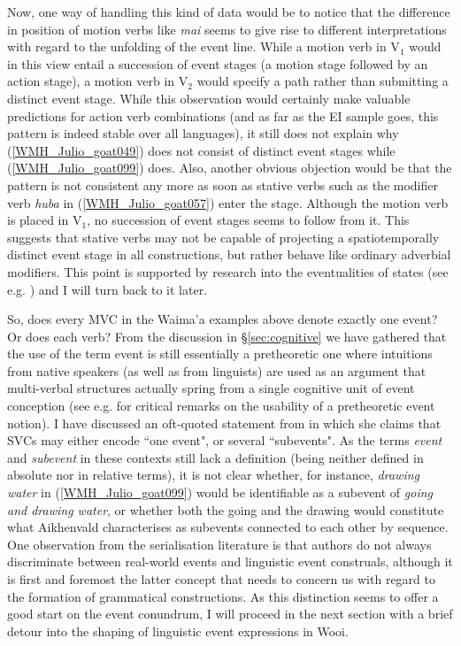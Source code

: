 Now, one way of handling this kind of data would be to notice that the difference in position of motion verbs like \textit{mai} seems to give rise to different interpretations with regard to the unfolding of the event line. While a motion verb in V$_1$ would in this view entail a succession of event stages (a motion stage followed by an action stage), a motion verb in V$_2$ would specify a path rather than submitting a distinct event stage. While this observation would certainly make valuable predictions for action verb combinations (and as far as the EI sample goes, this pattern is indeed stable over all languages), it still does not explain why (\ref{WMH_Julio_goat049}) does not consist of distinct event stages while (\ref{WMH_Julio_goat099}) does. Also, another obvious objection would be that the pattern is not consistent any more as soon as stative verbs such as the modifier verb \textit{huba} in (\ref{WMH_Julio_goat057}) enter the stage. Although the motion verb is placed in V$_1$, no succession of event stages seems to follow from it. This suggests that stative verbs may not be capable of projecting a spatiotemporally distinct event stage in all constructions, but rather behave like ordinary adverbial modifiers. This point is supported by research into the eventualities of states (see e.g. \citealt{maienborn2005limits}) and I will turn back to it later.

So, does every MVC in the Waima'a examples above denote exactly one event? Or does each verb? From the discussion in §\ref{sec:cognitive} we have gathered that the use of the term event is still essentially a pretheoretic one where intuitions from native speakers (as well as from linguists) are used as an argument that multi-verbal structures actually spring from a single cognitive unit of event conception (see e.g. \citealt{haspelmath2016serial} for critical remarks on the usability of a pretheoretic event notion). I have discussed an oft-quoted statement from \citet{Aikhenvald2006} in which she claims that SVCs may either encode ``one event", or several ``subevents". As the terms \textit{event} and \textit{subevent} in these contexts still lack a definition (being neither defined in absolute nor in relative terms), it is not clear whether, for instance, \textit{drawing water} in (\ref{WMH_Julio_goat099}) would be identifiable as a subevent of \textit{going and drawing water}, or whether both the going and the drawing would constitute what Aikhenvald characterises as subevents connected to each other by sequence. One observation from the serialisation literature is that authors do not always discriminate between real-world events and linguistic event construals, although it is first and foremost the latter concept that needs to concern us with regard to the formation of grammatical constructions. As this distinction seems to offer a good start on the event conundrum, I will proceed in the next section with a brief detour into the shaping of linguistic event expressions in Wooi.

